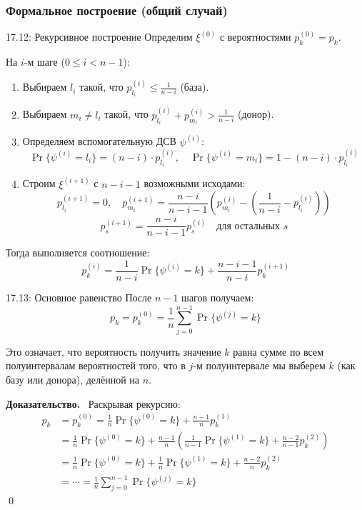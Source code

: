 \documentclass[a4paper,12pt]{article}
\newcommand{\myproof}{\textbf{Доказательство.}\ }
\begin{document}
	\subsubsection{Формальное построение (общий случай)}
	
	\begin{definitionbox}{17.12: Рекурсивное построение}
		Определим \(\xi^{(0)}\) с вероятностями \(p_k^{(0)} = p_k\).
		
		На \(i\)-м шаге (\(0 \le i < n-1\)):
		\begin{enumerate}
			\item Выбираем \(l_i\) такой, что \(p_{l_i}^{(i)} \le \frac{1}{n-i}\) (база).
			\item Выбираем \(m_i \neq l_i\) такой, что \(p_{l_i}^{(i)} + p_{m_i}^{(i)} > \frac{1}{n-i}\) (донор).
			\item Определяем вспомогательную ДСВ \(\psi^{(i)}\):
			\[ \Pr\{\psi^{(i)} = l_i\} = (n-i) \cdot p_{l_i}^{(i)}, \quad \Pr\{\psi^{(i)} = m_i\} = 1 - (n-i) \cdot p_{l_i}^{(i)} \]
			\item Строим \(\xi^{(i+1)}\) с \(n-i-1\) возможными исходами:
			\[ p_{l_i}^{(i+1)} = 0, \quad p_{m_i}^{(i+1)} = \frac{n-i}{n-i-1} \left( p_{m_i}^{(i)} - \left(\frac{1}{n-i} - p_{l_i}^{(i)}\right) \right) \]
			\[ p_s^{(i+1)} = \frac{n-i}{n-i-1} p_s^{(i)} \quad \text{для остальных } s \]
		\end{enumerate}
		
		Тогда выполняется соотношение:
		\[ p_k^{(i)} = \frac{1}{n-i} \Pr\{\psi^{(i)} = k\} + \frac{n-i-1}{n-i} p_k^{(i+1)} \]
	\end{definitionbox}
	
	\begin{theorembox}{17.13: Основное равенство}
		После \(n-1\) шагов получаем:
		\[ p_k = p_k^{(0)} = \frac{1}{n} \sum_{j=0}^{n-1} \Pr\{\psi^{(j)} = k\} \]
		
		Это означает, что вероятность получить значение \(k\) равна сумме по всем полуинтервалам вероятностей того, что в \(j\)-м полуинтервале мы выберем \(k\) (как базу или донора), делённой на \(n\).
	\end{theorembox}
	
	\myproof
	Раскрывая рекурсию:
	\begin{align*}
		p_k &= p_k^{(0)} = \frac{1}{n} \Pr\{\psi^{(0)} = k\} + \frac{n-1}{n} p_k^{(1)} \\
		&= \frac{1}{n} \Pr\{\psi^{(0)} = k\} + \frac{n-1}{n} \left( \frac{1}{n-1} \Pr\{\psi^{(1)} = k\} + \frac{n-2}{n-1} p_k^{(2)} \right) \\
		&= \frac{1}{n} \Pr\{\psi^{(0)} = k\} + \frac{1}{n} \Pr\{\psi^{(1)} = k\} + \frac{n-2}{n} p_k^{(2)} \\
		&= \cdots = \frac{1}{n} \sum_{j=0}^{n-1} \Pr\{\psi^{(j)} = k\}
	\end{align*}
	\qed
	
\end{document}
